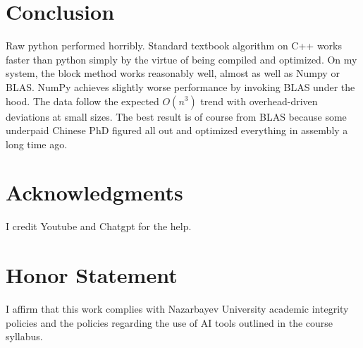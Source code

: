 \documentclass[11pt,a4paper]{article}
\newcommand{\honor}{I affirm that this work complies with Nazarbayev University academic integrity policies and the policies regarding the use of AI tools outlined in the course syllabus.}
\begin{document}
	\section{Conclusion}
	Raw python performed horribly. Standard textbook algorithm on C++ works faster than python simply by the virtue of being compiled and optimized. On my system, the block method works reasonably well, almost as well as Numpy or BLAS. NumPy achieves slightly worse performance by invoking BLAS under the hood. The data follow the expected $O(n^3)$ trend with overhead-driven deviations at small sizes. The best result is of course from BLAS because some underpaid Chinese PhD figured all out and optimized everything in assembly a long time ago.
	
	\section*{Acknowledgments}
	I credit Youtube and Chatgpt for the help.
	
	\section*{Honor Statement}
	\honor
	
	
\end{document}
